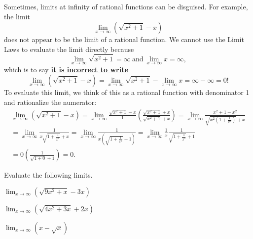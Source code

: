 \documentclass[10pt]{amsart}
\begin{document}
\newpage
Sometimes, limits at infinity of rational functions can be disguised.  For example, the limit
\[\lim_{x \to \infty} \left(\sqrt{x^2 + 1} - x\right)\]
does not appear to be the limit of a rational function.
We cannot use the Limit Laws to evaluate the limit directly because
\[\lim_{x \to \infty} \sqrt{x^2 + 1} = \infty\ \text{and}\ \lim_{x \to \infty} x = \infty,\]
which is to say \underline{\textbf{it is incorrect to write}}
\[\lim_{x \to \infty} \left(\sqrt{x^2 + 1} - x\right) = \lim_{x \to \infty} \sqrt{x^2 + 1} - \lim_{x \to \infty} x = \infty - \infty = 0!\]
To evaluate this limit, we think of this as a rational function with denominator 1 and rationalize the numerator:
\begin{gather*}
  \lim_{x \to \infty} \left(\sqrt{x^2 + 1} - x\right)
  = \lim_{x \to \infty} \frac{\sqrt{x^2 + 1} - x}{1} \left(\frac{\sqrt{x^2 + 1} + x}{\sqrt{x^2 + 1} + x}\right)
  = \lim_{x \to \infty} \frac{x^2 + 1 - x^2}{\sqrt{x^2\left(1 + \frac{1}{x^2}\right)} + x}\\
  = \lim_{x \to \infty} \frac{1}{x\sqrt{1 + \frac{1}{x^2}} + x}
  = \lim_{x \to \infty} \frac{1}{x\left(\sqrt{1 + \frac{1}{x^2}} + 1\right)}
  =\lim_{x \to \infty} \frac{1}{x}\frac{1}{\sqrt{1 + \frac{1}{x^2}} + 1}\\
  = 0 \left(\frac{1}{\sqrt{1 + 0} + 1}\right)
  = 0.
\end{gather*}

Evaluate the following limits.
\begin{multicols}{3}
  \begin{thm}
  \(\displaystyle{\lim_{x \to \infty} \left(\sqrt{9x^2 + x} - 3x\right)}\)
\end{thm}

  \begin{thm}
  \(\displaystyle{\lim_{x \to \infty} \left(\sqrt{4x^2 + 3x} + 2x\right)}\)
\end{thm}

  \begin{thm}
  \(\displaystyle{\lim_{x \to \infty} \left(x - \sqrt{x}\right)}\)
\end{thm}

\end{multicols}
\end{document}
